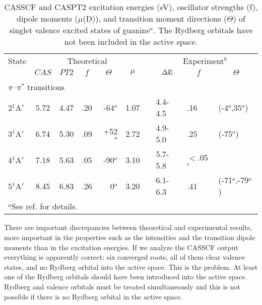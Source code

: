 %
\begin{table}[hp]
\begin{center}
\caption{\label{tab:gua1}CASSCF and CASPT2 excitation energies (eV), oscillator strengths (f),
dipole moments ($\mu$(D)), and transition moment directions ($\Theta$) of singlet valence excited states of guanine$^a$. The Rydberg orbitals have not been included in the active space.}
\begin{tabular}{lccrrrrlll}
\hline
State &  \multicolumn{5}{c}{Theoretical} &  & \multicolumn{3}{c}{Experiment$^b$} \\ \cline{2-6}\cline{8-10}
        &
  $CAS$ &
  $PT2$ &
  \multicolumn{1}{c}{$f$} &
  \multicolumn{1}{c}{$\Theta$} &
  \multicolumn{1}{c}{$\mu$} & &
  \multicolumn{1}{c}{$\Delta{\rm E}$} &
  \multicolumn{1}{c}{$f$} &
  \multicolumn{1}{c}{$\Theta$} \\\hline
\\
\multicolumn{10}{l}{$\pi$--$\pi^*$ transitions} \\
2$^1$A$'$& 5.72 & 4.47 & .20 & -64$^o$& 1.07 & &4.4-4.5& .16 & (-4$^o$,35$^o$) \\
3$^1$A$'$& 6.74 & 5.30 & .09 & +52$^o$& 2.72 & & 4.9-5.0 & .25 & (-75$^o$) \\
4$^1$A$'$& 7.18 & 5.63 & .05 & -90$^o$& 3.10 & & 5.7-5.8 & $<$.05$^c$ \\
5$^1$A$'$& 8.45 & 6.83 & .26 &   0$^o$& 3.20 & & 6.1-6.3 & .41&(-71$^o$,-79$^o$)\\
\hline
\multicolumn{10}{l}{\footnotesize{$^a$See ref. \cite{Fuelscher:97a} for details.}} \\
\end{tabular}
\end{center}
\end{table}

There are important discrepancies between theoretical and
experimental results, more important in the properties such as the
intensities and the transition dipole moments than in the excitation
energies. If we analyze the CASSCF output everything
is apparently correct: six converged roots, all of them clear valence
states, and no Rydberg orbital into the active space. This is the problem.
At least one of the Rydberg orbitals should have been introduced into the
active space. Rydberg and valence orbitals must be treated simultaneously
and this is not possible if there is no Rydberg orbital in the active space.


